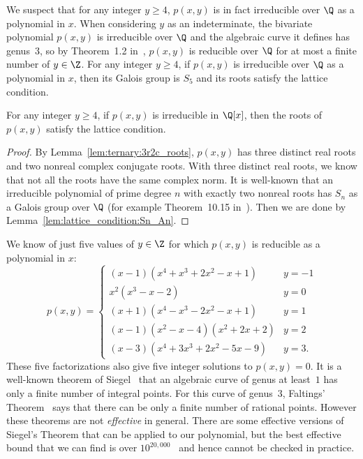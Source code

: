 \documentclass[11pt]{article}
\begin{document}
We suspect that for any integer $y \ge 4$,
$p(x,y)$ is in fact irreducible over $\Q$ as a polynomial in $x$.
When considering $y$ as an indeterminate,
the bivariate polynomial $p(x,y)$ is irreducible over $\Q$ and the algebraic curve it defines has genus~$3$,
so by Theorem~1.2 in~\cite{Mul99},
$p(x,y)$ is reducible over $\Q$ for at most a finite number of $y \in \Z$.
For any integer $y \ge 4$, if $p(x,y)$ is irreducible over $\Q$ 
as a polynomial in $x$, then
its Galois group is $S_5$ and its roots satisfy the lattice condition.

\begin{lemma} \label{lem:ternary:lattice:y>=4:irreducible}
 For any integer $y \ge 4$,
 if $p(x,y)$ is irreducible in $\Q[x]$,
 then the roots of $p(x,y)$ satisfy the lattice condition.
\end{lemma}

\begin{proof}
 By Lemma~\ref{lem:ternary:3r2c_roots},
 $p(x,y)$ has three distinct real roots and two nonreal complex conjugate roots.
 With three distinct real roots,
 we know that not all the roots have the same complex norm.
 It is well-known that an irreducible polynomial of prime degree $n$ with exactly two nonreal roots has $S_n$ as a Galois group over $\Q$
 (for example Theorem~10.15 in~\cite{Ste03}).
 Then we are done by Lemma~\ref{lem:lattice_condition:Sn_An}.
\end{proof}

We know of just five values of $y \in \Z$ for which $p(x,y)$ is reducible as a polynomial in $x$:
\[
 p(x,y) =
 \begin{cases}
  (x - 1) (x^4 + x^3 + 2 x^2 - x + 1)     & y = -1\\
  x^2 (x^3 - x - 2)                       & y =  0\\
  (x + 1) (x^4 - x^3 - 2 x^2 - x + 1)     & y =  1\\
  (x - 1) (x^2 - x - 4) (x^2 + 2 x + 2)   & y =  2\\
  (x - 3) (x^4 + 3 x^3 + 2 x^2 - 5 x - 9) & y =  3.
 \end{cases}
\]
These five factorizations also give five integer solutions to $p(x,y) = 0$.
It is a well-known theorem of Siegel~\cite{Sie29} that an algebraic curve of genus at least~$1$ has only a finite number of integral points.
For this curve of genus~$3$,
Faltings' Theorem~\cite{Fal83} says that there can be only a finite number of rational points.
However these theorems are not \emph{effective} in general.
There are some effective versions of Siegel's Theorem that can be applied to our polynomial,
but the best effective bound that we can find is over $10^{20,000}$~\cite{Wal92} and hence cannot be checked in practice.
\end{document}
